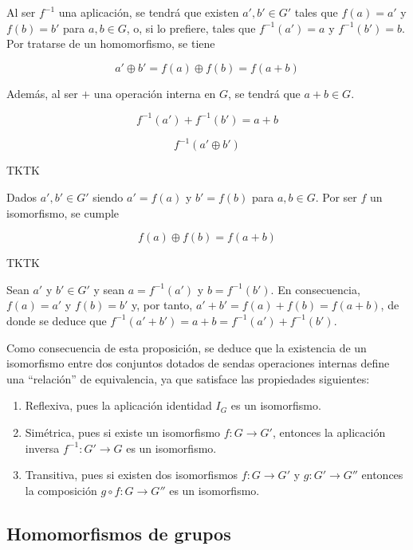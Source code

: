 Al ser $f^{-1}$ una aplicación, se tendrá que existen $a', b' \in G'$ tales
que $f(a) = a'$ y $f(b) = b'$ para $a, b \in G$, o, si lo prefiere, tales
que $f^{-1}(a') = a$ y $f^{-1}(b') = b$. Por tratarse de un homomorfismo, se
tiene

$$ a' \oplus b' = f(a) \oplus f(b) = f(a + b) $$

\noindent Además, al ser $+$ una operación interna en $G$, se tendrá que $a
+ b \in G$.


$$ f^{-1}(a') + f^{-1}(b') = a + b $$

$$ f^{-1}(a' \oplus b') $$

TKTK

Dados $a', b' \in G'$ siendo $a' = f(a)$ y $b' = f(b)$ para $a, b \in G$.
Por ser $f$ un isomorfismo, se cumple

$$ f(a) \oplus f(b) = f(a + b) $$

TKTK

Sean $a'$ y $b' \in G'$ y sean $a = f^{-1}(a')$ y $b =
f^{-1}(b')$. En consecuencia, $f(a) = a'$ y $f(b) = b'$ y, por tanto, $a' +
b' = f(a) + f(b) = f(a + b)$, de donde se deduce que $f^{-1}(a' + b') = a +
b = f^{-1}(a') + f^{-1}(b')$.

Como consecuencia de esta proposición, se deduce que la existencia de un
isomorfismo entre dos conjuntos dotados de sendas operaciones internas
define una ``relación'' de equivalencia, ya que satisface las propiedades
siguientes:

\begin{enumerate}
  \item Reflexiva, pues la aplicación identidad $I_G$ es un isomorfismo.

  \item Simétrica, pues si existe un isomorfismo $f: G \longrightarrow G'$,
    entonces la aplicación inversa $f^{-1}: G' \longrightarrow G$ es un
    isomorfismo.

  \item Transitiva, pues si existen dos isomorfismos $f: G \longrightarrow
    G'$ y $g: G' \longrightarrow G''$ entonces la composición $g \circ f: G
    \longrightarrow G''$ es un isomorfismo.
\end{enumerate}





\subsection{Homomorfismos de grupos}

